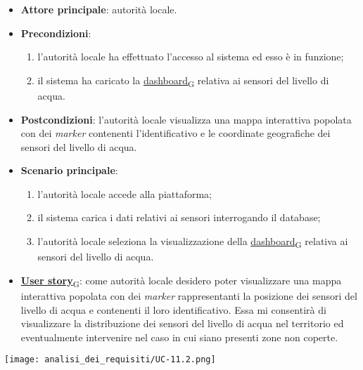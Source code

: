 \begin{itemize}
	\item \textbf{Attore principale}: autorità locale.
	\item \textbf{Precondizioni}:
	      \begin{enumerate}
		      \item l'autorità locale ha effettuato l'accesso al sistema ed esso è in funzione;
		      \item il sistema ha caricato la \href{https://7last.github.io/docs/pb/documentazione-interna/glossario\#dashboard}{dashboard\textsubscript{G}} relativa ai sensori del livello di acqua.
	      \end{enumerate}
	\item \textbf{Postcondizioni}: l'autorità locale visualizza una mappa interattiva popolata con dei \textit{marker} contenenti l'identificativo e le coordinate geografiche dei sensori del livello di acqua.
	\item \textbf{Scenario principale}:
	      \begin{enumerate}
		      \item l'autorità locale accede alla piattaforma;
		      \item il sistema carica i dati relativi ai sensori interrogando il database;
		      \item l'autorità locale seleziona la visualizzazione della \href{https://7last.github.io/docs/pb/documentazione-interna/glossario\#dashboard}{dashboard\textsubscript{G}} relativa ai sensori del livello di acqua.
	      \end{enumerate}
	\item \href{https://7last.github.io/docs/pb/documentazione-interna/glossario\#user-story}{\textbf{User story}\textsubscript{G}}:
	      come autorità locale desidero poter visualizzare una mappa interattiva popolata con dei \textit{marker} rappresentanti la posizione dei sensori del livello di acqua
	      e contenenti il loro identificativo. Essa mi consentirà di visualizzare la distribuzione dei sensori del livello di acqua nel territorio ed eventualmente intervenire nel caso in cui siano presenti zone non coperte.
\end{itemize}
\begin{center}
	\texttt{[image: analisi\_dei\_requisiti/UC-11.2.png]}
\end{center}

